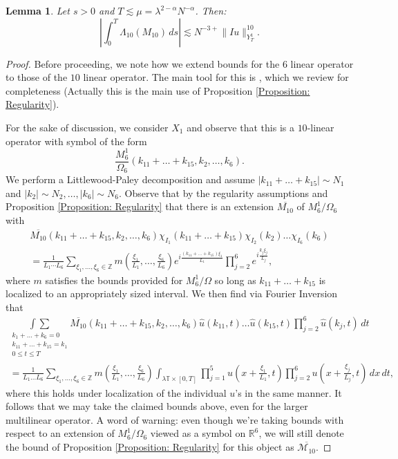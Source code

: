 \documentclass[12pt, letterpaper]{amsart}
\newtheorem{lemma}{Lemma}
\begin{document}
\begin{lemma}\label{Lemma: 10 linear operator}
    Let $s > 0$ and $T\lesssim \mu = \lambda^{2-\alpha}N^{-\alpha}$. Then:
    \begin{equation}\label{Equation: Lemma L10 integral}
\left|\int_0^T \Lambda_{10}(M_{10})\,ds\right|\lesssim N^{-3+}\|Iu\|_{Y_T^1}^{10}.
    \end{equation}
\end{lemma}
\begin{proof}
    Before proceeding, we note how we extend bounds for the $6$ linear operator to those of the $10$ linear operator. The main tool for this is \cite[Proposition 5.9]{schippa2024improved}, which we review for completeness (Actually this is the main use of Proposition \ref{Proposition: Regularity}). 
    
    For the sake of discussion, we consider $X_1$ and observe that this is a $10$-linear operator with symbol of the form
    \[
    \frac{M^1_6}{\Omega_6}(k_{11}+\dots + k_{15}, k_2, \dots, k_6).
    \]
    We perform a Littlewood-Paley decomposition and assume $|k_{11}+\dots +k_{15}| \sim N_1$ and $|k_2|\sim N_2,\dots, |k_6|\sim N_6$. Observe that by the regularity assumptions and Proposition \ref{Proposition: Regularity} that there is an extension $\overline{M_{10}}$ of $M^1_6/\Omega_6$ with
    \begin{multline*}
\overline{M_{10}}(k_{11}+\dots + k_{15}, k_2, \dots, k_6)\chi_{I_1}(k_{11}+\dots+k_{15})\chi_{I_2}(k_2)\dots\chi_{I_6}(k_6)\\
= \frac{1}{L_1\cdots L_6}\sum_{\xi_1,\dots, \xi_6\in\mathbb{Z}}m(\tfrac{\xi_1}{L_1},\dots,\tfrac{\xi_6}{L_6})e^{i\frac{(k_{11}+\dots+k_{15})\xi_1}{L_1}}\prod_{j=2}^6e^{i\frac{k_j\xi_j}{L_j}},
    \end{multline*}
    where $m$ satisfies the bounds provided for $M^1_6/\Omega$ so long as $k_{11}+\dots +k_{15}$ is localized to an appropriately sized interval. We then find via Fourier Inversion that
    \begin{multline}\label{Equation: 10 linear reduction firs step}
        \underset{\substack{k_1+\dots+k_6 = 0\\k_{11}+\dots+k_{15} = k_1\\0\leq t\leq T}}{\int\sum}\overline{M_{10}}(k_{11}+\dots+k_{15}, k_2,\dots, k_6)\widehat{u}(k_{11},t)\dots \widehat{u}(k_{15},t)\prod_{j=2}^6\widehat{u}(k_j,t)\,dt\\
        =\frac{1}{L_1\dots L_6}\sum_{\xi_1,\dots, \xi_6\in \mathbb{Z}}m(\tfrac{\xi_1}{L_1},\dots,\tfrac{\xi_6}{L_6})\int_{\lambda\mathbb{T}\times [0,T]}\prod_{j=1}^5u(x+\frac{\xi_{1}}{L_1},t)\prod_{j=2}^6u(x+\tfrac{\xi_j}{L_j},t)\,dx\,dt,
    \end{multline}
    where this holds under localization of the individual $u$'s in the same manner. It follows that we may take the claimed bounds above, even for the larger multilinear operator. A word of warning: even though we're taking bounds with respect to an extension of $M^1_6/\Omega_6$ viewed as a symbol on $\mathbb{R}^6$, we will still denote the bound of Proposition \ref{Proposition: Regularity} for this object as $\overline{\mathcal{M}_{10}}$.


\end{proof}
\end{document}
